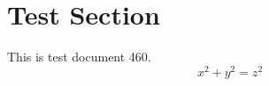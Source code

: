 \documentclass{article}
\begin{document}
\section{Test Section}
This is test document 460.
\begin{equation}
x^2 + y^2 = z^2
\end{equation}
\end{document}

